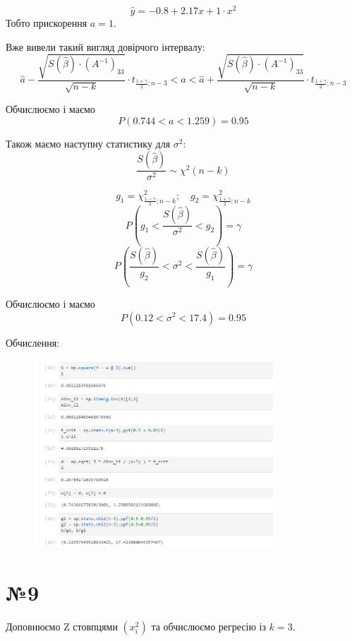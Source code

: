 \documentclass[11pt, a4paper]{article} %
\begin{document}
$$\hat y = -0.8 + 2.17 x + 1 \cdot x^2$$
Тобто прискорення $a = 1$.

Вже вивели такий вигляд довірчого інтервалу:
$$\hat a - \frac{\sqrt{S(\hat \beta) \cdot \left(A^{-1}\right)_{33}}}{\sqrt{n-k}} \cdot t_{\frac{1+\gamma}{2};n-3} < a < \hat a + \frac{\sqrt{S(\hat \beta) \cdot \left(A^{-1}\right)_{33}}}{\sqrt{n-k}} \cdot t_{\frac{1+\gamma}{2};n-3}$$

Обчислюємо і маємо
$$P(0.744 < a < 1.259) = 0.95$$

Також маємо наступну статистику для $\sigma^2$:
$$\frac{S(\hat \beta)}{\sigma^2} \sim \chi^2(n-k)$$

$$g_1 = \chi^2_{\frac{1-\gamma}{2};n-k}; \quad g_2 = \chi^2_{\frac{1+\gamma}{2};n-k}$$
$$P\left(g_1 < \frac{S(\hat \beta)}{\sigma^2} < g_2\right) = \gamma$$
$$P\left(\frac{S(\hat \beta)}{g_2} < \sigma^2 < \frac{S(\hat \beta)}{g_1}\right) = \gamma$$

Обчислюємо і маємо
$$P(0.12 < \sigma^2 < 17.4) = 0.95$$

Обчислення:
\begin{figure}[h]
    \centering
    \includegraphics[width=0.8\textwidth]{task8.1.png}
\end{figure}


\pagebreak

\section*{№9}
Доповнюємо Z стовпцями $(x_i^2)$ та обчислюємо регресію із $k=3$.
\end{document}

